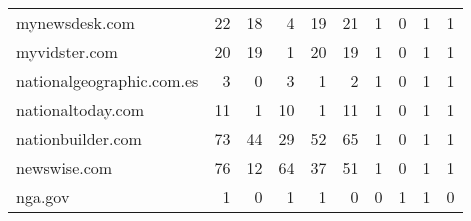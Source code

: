 \begin{tabular}{lrrrrrrrrr}
             mynewsdesk.com &                               22 &                                 18 &                                      4 &                           19 &                          21 &                                   1 &                                      0 &                             1 &                            1 \\
              myvidster.com &                               20 &                                 19 &                                      1 &                           20 &                          19 &                                   1 &                                      0 &                             1 &                            1 \\
  nationalgeographic.com.es &                                3 &                                  0 &                                      3 &                            1 &                           2 &                                   1 &                                      0 &                             1 &                            1 \\
          nationaltoday.com &                               11 &                                  1 &                                     10 &                            1 &                          11 &                                   1 &                                      0 &                             1 &                            1 \\
          nationbuilder.com &                               73 &                                 44 &                                     29 &                           52 &                          65 &                                   1 &                                      0 &                             1 &                            1 \\
               newswise.com &                               76 &                                 12 &                                     64 &                           37 &                          51 &                                   1 &                                      0 &                             1 &                            1 \\
                    nga.gov &                                1 &                                  0 &                                      1 &                            1 &                           0 &                                   0 &                                      1 &                             1 &                            0 \\

\end{tabular}
